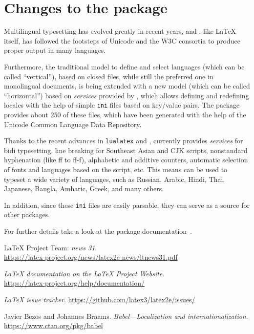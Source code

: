 \documentclass{ltnews}
\begin{document}
\section{Changes to the  package}

Multilingual typesetting has evolved greatly in recent years, and
, like \LaTeX{} itself, has followed the footsteps of
Unicode and the W3C consortia to produce proper output in many
languages.

Furthermore, the traditional model to define and select languages
(which can be called \enquote{vertical}), based on closed files, while
still the preferred one in monolingual documents, is being extended
with a new model (which can be called \enquote{horizontal}) based on
\emph{services} provided by , which allows defining and
redefining locales with the help of simple \texttt{ini} files based on
key\slash value pairs.  The  package provides about 250 of these files, which
have been generated with the help of the Unicode Common Language Data
Repository.

Thanks to the recent advances in \texttt{lualatex} and
,  currently provides \emph{services} for bidi
typesetting, line breaking for Southeast Asian and CJK scripts,
nonstandard hyphenation (like ff to ff-f), alphabetic and additive
counters, automatic selection of fonts and languages based on the
script, etc. This means  can be used to typeset a wide variety of
languages, such as Russian, Arabic, Hindi, Thai, Japanese, Bangla, Amharic,
Greek, and many others.

In addition, since these \texttt{ini} files are easily parsable, they can
serve as a source for other packages.

For further details take a look at the  package
documentation~\cite{32:babel}.

\medskip
\begin{thebibliography}{9}

\fontsize{9.3}{11.3}\selectfont

 \LaTeX{} Project Team:
  \emph{\LaTeXe{} news 31}.\\
  \url{https://latex-project.org/news/latex2e-news/ltnews31.pdf}

  \emph{\LaTeX{} documentation on the \LaTeX{} Project Website}.\\
  \url{https://latex-project.org/help/documentation/}

  \emph{\LaTeX{} issue tracker}.
  \url{https://github.com/latex3/latex2e/issues/}

  Javier Bezos and Johannes Braams.
  \emph{Babel---Localization and internationalization}.\\
  \url{https://www.ctan.org/pkg/babel}

\end{thebibliography}
\end{document}
